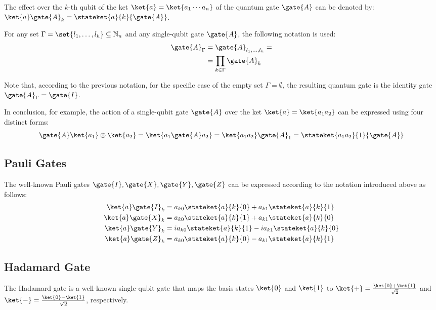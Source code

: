 \documentclass[sigconf,natbib=false]{acmart}
\begin{document}
\begin{notation}
The effect over the $k$-th qubit of the  ket $\ket{a}=\ket{a_1\cdots a_n}$ of the quantum gate $\gate{A}$ can be denoted by:  $\ket{a}\gate{A}_k=\stateket{a}{k}{\gate{A}}$.
\end{notation}

\begin{notation}
For any set $\Gamma=\set{l_1,\dots,l_h}\subseteq\mathbb{N}_n$ and any single-qubit gate $\gate{A}$, the following notation is used:
\begin{align}
\gate{A}_{\Gamma} &= \gate{A}_{l_1,\dots,l_h}=\\
&=\prod_{k\in\Gamma}\gate{A}_k
\end{align}
\end{notation}

Note that, according to the previous notation, for the specific case of the empty set $\Gamma=\emptyset$, the resulting quantum gate is the identity gate $\gate{A}_\Gamma=\gate{I}$.

In conclusion, for example,  the action of a single-qubit gate $\gate{A}$ over the ket $\ket{a}=\ket{a_1a_2}$ can be expressed using four distinct forms:
\begin{equation*}
\gate{A}\ket{a_1}\otimes \ket{a_2} = \ket{a_1\gate{A}a_2}= \ket{a_1a_2}\gate{A}_1= \stateket{a_1a_2}{1}{\gate{A}}
\end{equation*}

\subsection{Pauli Gates}
The well-known Pauli gates $\gate{I}, \gate{X}, \gate{Y}, \gate{Z}$ can be expressed according to the  notation  introduced above as follows:
\begin{align}
	\ket{a}\gate{I}_k &= a_{k0}\stateket{a}{k}{0}+a_{k1}\stateket{a}{k}{1} \\
	\ket{a}\gate{X}_k &= a_{k0}\stateket{a}{k}{1}+a_{k1}\stateket{a}{k}{0}\\
	\ket{a}\gate{Y}_k &= i a_{k0}\stateket{a}{k}{1}-i a_{k1}\stateket{a}{k}{0}\\
	\ket{a}\gate{Z}_k &= a_{k0}\stateket{a}{k}{0}-a_{k1}\stateket{a}{k}{1}
\end{align}

\subsection{Hadamard Gate}
The Hadamard gate is a well-known single-qubit gate that maps the basis states $\ket{0}$ and $\ket{1}$  to $\ket{+}=\frac{\ket{0}+\ket{1}}{\sqrt{2}}$ and $\ket{-}=\frac{\ket{0}-\ket{1}}{\sqrt{2}}$, respectively.
\end{document}
